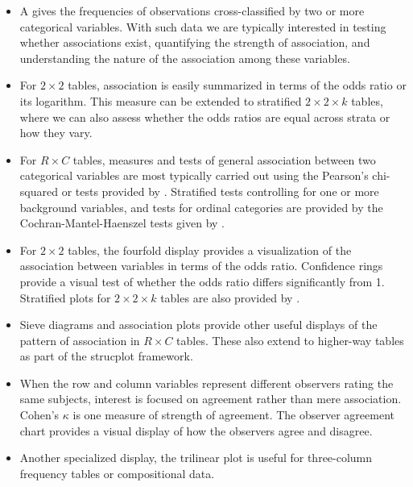 \documentclass[10pt,krantz2]{krantz}\usepackage[]{graphicx}\usepackage[]{color}
\begin{document}
\begin{itemize}
  \item A \ctab gives the frequencies of observations
  cross-classified by two or more categorical variables.
  With such data we are typically interested in testing whether
  associations exist, quantifying the strength of association,
  and understanding the nature of the association among these
  variables.

  \item For $2 \times 2$ tables, association is
   easily summarized in terms of the odds ratio or its logarithm.
   This measure can be extended to stratified $2 \times 2 \times k$
   tables, where we can also assess whether the odds ratios are
   equal across strata or how they vary.

  \item For $R \times C$ tables, measures and
  tests of general association between two categorical variables are
  most typically carried out using the Pearson's chi-squared or
  \LR tests provided by .
  Stratified tests controlling for one or more background variables, and
  tests for ordinal categories are provided by the
  Cochran-Mantel-Haenszel tests given by .

  \item For $2 \times 2$ tables, the fourfold display provides a
  visualization of the association between variables in terms of
  the odds ratio.  Confidence rings provide a visual test of
  whether the odds ratio differs significantly from 1. Stratified
  plots for $2 \times 2 \times k$ tables are also provided by .

  \item Sieve diagrams and association plots provide other useful displays of the pattern of association in $R \times C$ tables.  These also extend to higher-way tables
  as part of the strucplot framework.

  \item When the row and column variables represent different
  observers rating the same subjects, interest is focused on
  agreement rather than mere association.  Cohen's $\kappa$ is one
  measure of strength of agreement.  The observer agreement chart
  provides a visual display of how the observers agree and
  disagree.

  \item Another specialized display, the trilinear plot is useful
  for three-column frequency tables or compositional data.
\end{itemize}
\end{document}
